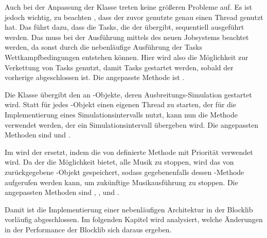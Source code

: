 Auch bei der Anpassung der Klasse \classEventManager{} treten keine größeren Probleme auf. Es ist jedoch wichtig, zu beachten , dass der zuvor genutzte \classExecutorService{} genau einen Thread genutzt hat. Das führt dazu, dass die Tasks, die der \classEventManager{} übergibt, sequentiell ausgeführt werden. Das muss bei der Ausführung mittels des neuen Jobsystems beachtet werden, da sonst durch die nebenläufige Ausführung der Tasks Wettkampfbedingungen entstehen können. Hier wird also die Möglichkeit zur Verkettung von Tasks genutzt, damit Tasks gestartet werden, sobald der vorherige abgeschlossen ist. Die angepasste Methode ist .

Die Klasse \classFluidManager{} übergibt den \classBlocklibExecutor{} an \classFluid{}-Objekte, deren Ausbreitungs-Simulation gestartet wird. Statt für jedes \classFluid{}-Objekt einen eigenen Thread zu starten, der  für die Implementierung eines Simulationsintervalls nutzt, kann nun die Methode  verwendet werden, der ein Simulationsintervall übergeben wird. Die angepassten Methoden sind  und .

Im \classAudioManager{} wird der \classTimer{} ersetzt, indem die von \classBlocklibExecutorService{} definierte Methode  mit Priorität  verwendet wird. Da der \classAudioManager{} die Möglichkeit bietet, alle Musik zu stoppen, wird das von  zurückgegebene \classFuture{}-Objekt gespeichert, sodass gegebenenfalls dessen -Methode aufgerufen werden kann, um zukünftige Musikausführung zu stoppen. Die angepassten Methoden sind , ,  und .

Damit ist die Implementierung einer nebenläufigen Architektur in der Blocklib vorläufig abgeschlossen. Im folgenden Kapitel wird analysiert, welche Änderungen in der Performance der Blocklib sich daraus ergeben.